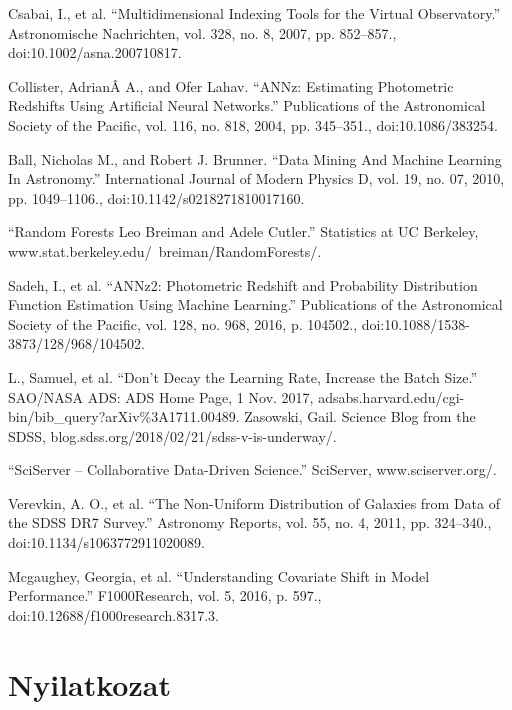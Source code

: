 \documentclass[12pt,letterpaper,twoside,openright]{book}
\begin{document}
\begin{thebibliography}{99\kern\bibindent}
Csabai, I., et al. “Multidimensional Indexing Tools for the Virtual Observatory.” Astronomische Nachrichten, vol. 328, no. 8, 2007, pp. 852–857., doi:10.1002/asna.200710817.

Collister, AdrianÂ A., and Ofer Lahav. “ANNz: Estimating Photometric Redshifts Using Artificial Neural Networks.” Publications of the Astronomical Society of the Pacific, vol. 116, no. 818, 2004, pp. 345–351., doi:10.1086/383254.

Ball, Nicholas M., and Robert J. Brunner. “Data Mining And Machine Learning In Astronomy.” International Journal of Modern Physics D, vol. 19, no. 07, 2010, pp. 1049–1106., doi:10.1142/s0218271810017160.

“Random Forests Leo Breiman and Adele Cutler.” Statistics at UC Berkeley, www.stat.berkeley.edu/~breiman/RandomForests/.


Sadeh, I., et al. “ANNz2: Photometric Redshift and Probability Distribution Function Estimation Using Machine Learning.” Publications of the Astronomical Society of the Pacific, vol. 128, no. 968, 2016, p. 104502., doi:10.1088/1538-3873/128/968/104502.

L., Samuel, et al. “Don't Decay the Learning Rate, Increase the Batch Size.” SAO/NASA ADS: ADS Home Page, 1 Nov. 2017, adsabs.harvard.edu/cgi-bin/bib\_{}query?arXiv\%{}3A1711.00489.
Zasowski, Gail. Science Blog from the SDSS, blog.sdss.org/2018/02/21/sdss-v-is-underway/.

“SciServer – Collaborative Data-Driven Science.” SciServer, www.sciserver.org/.

Verevkin, A. O., et al. “The Non-Uniform Distribution of Galaxies from Data of the SDSS DR7 Survey.” Astronomy Reports, vol. 55, no. 4, 2011, pp. 324–340., doi:10.1134/s1063772911020089.

Mcgaughey, Georgia, et al. “Understanding Covariate Shift in Model Performance.” F1000Research, vol. 5, 2016, p. 597., doi:10.12688/f1000research.8317.3.

\end{thebibliography}





\chapter*{Nyilatkozat}
\end{document}

